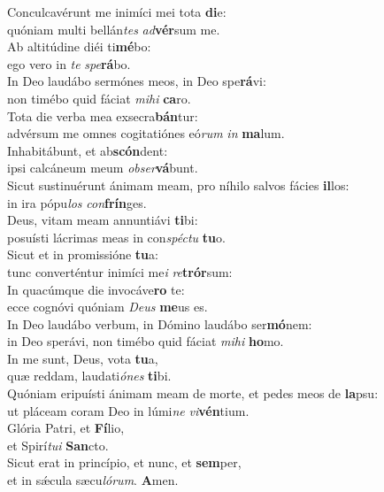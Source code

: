 \evenverse Conculcavérunt me inimíci mei tota \textbf{di}e:~\*\\
\evenverse quóniam multi bellán\textit{tes} \textit{ad}\textbf{vér}sum me.\\
\oddverse Ab altitúdine diéi ti\textbf{mé}bo:~\*\\
\oddverse ego vero in \textit{te} \textit{spe}\textbf{rá}bo.\\
\evenverse In Deo laudábo sermónes meos, in Deo spe\textbf{rá}vi:~\*\\
\evenverse non timébo quid fáciat \textit{mi}\textit{hi} \textbf{ca}ro.\\
\oddverse Tota die verba mea exsecra\textbf{bán}tur:~\*\\
\oddverse advérsum me omnes cogitatiónes eó\textit{rum} \textit{in} \textbf{ma}lum.\\
\evenverse Inhabitábunt, et ab\textbf{scón}dent:~\*\\
\evenverse ipsi calcáneum meum \textit{ob}\textit{ser}\textbf{vá}bunt.\\
\oddverse Sicut sustinuérunt ánimam meam, pro níhilo salvos fácies \textbf{il}los:~\*\\
\oddverse in ira pópu\textit{los} \textit{con}\textbf{frín}ges.\\
\evenverse Deus, vitam meam annuntiávi \textbf{ti}bi:~\*\\
\evenverse posuísti lácrimas meas in con\textit{spé}\textit{ctu} \textbf{tu}o.\\
\oddverse Sicut et in promissióne \textbf{tu}a:~\*\\
\oddverse tunc converténtur inimíci me\textit{i} \textit{re}\textbf{trór}sum:\\
\evenverse In quacúmque die invocáve\textbf{ro} te:~\*\\
\evenverse ecce cognóvi quóniam \textit{De}\textit{us} \textbf{me}us es.\\
\oddverse In Deo laudábo verbum, in Dómino laudábo ser\textbf{mó}nem:~\*\\
\oddverse in Deo sperávi, non timébo quid fáciat \textit{mi}\textit{hi} \textbf{ho}mo.\\
\evenverse In me sunt, Deus, vota \textbf{tu}a,~\*\\
\evenverse quæ reddam, laudati\textit{ó}\textit{nes} \textbf{ti}bi.\\
\oddverse Quóniam eripuísti ánimam meam de morte, et pedes meos de \textbf{la}psu:~\*\\
\oddverse ut pláceam coram Deo in lúmi\textit{ne} \textit{vi}\textbf{vén}tium.\\
\evenverse Glória Patri, et \textbf{Fí}lio,~\*\\
\evenverse et Spirí\textit{tu}\textit{i} \textbf{San}cto.\\
\oddverse Sicut erat in princípio, et nunc, et \textbf{sem}per,~\*\\
\oddverse et in sǽcula sæcu\textit{ló}\textit{rum}. \textbf{A}men.\\
